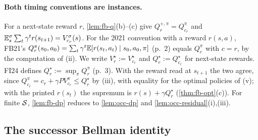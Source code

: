 \paragraph{Both timing conventions are instances.}
For a next-state reward $r$, \cref{lem:fb-q}(b)--(c) give $Q^{+,\pi}_r=Q^\pi_{c_r}$ and $\mathbb{E}^\sigma_s\sum_t\gamma^tr(s_{t+1})=V^\sigma_{c_r}(s)$.
For the 2021 convention with a reward $r(s,a)$, FB21's $Q^\pi_r(s_0,a_0)=\sum_t\gamma^t\mathbb{E}[r(s_t,a_t)\mid s_0,a_0,\pi]$ (p.~2) equals $Q^\pi_c$ with $c=r$, by the computation of (ii).
We write $V^\star_r:=V^\star_{c_r}$ and $Q^\star_r:=Q^\star_{c_r}$ for next-state rewards.
FI24 defines $Q^\star_r:=\sup_\pi Q^\pi_r$ (p.~3). With the reward read at $s_{t+1}$  the two agree, since $Q^\pi_{c_r}=c_r+\gamma PV^\pi_{c_r}\le Q^\star_r$ by (iii), with equality for the optimal policies of (v); with the printed $r(s_t)$ the supremum is $r(s)+\gamma Q^\star_r$ (\cref{thm:fb-opt}(c)).
For finite $\mathcal{S}$, \cref{lem:fb-dp} reduces to \cref{lem:occ-dp} and \cref{lem:occ-residual}(i),(iii).

\subsection{The successor Bellman identity}\label{sec:fb-bellman}


